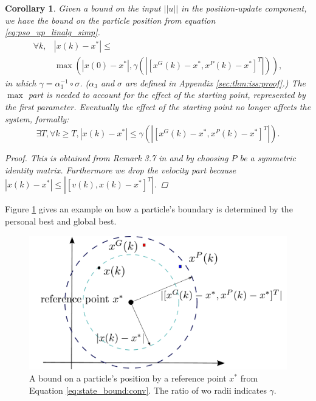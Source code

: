 \documentclass{sig-alternate}
\newtheorem{mycoro}{Corollary}
\begin{document}
\begin{mycoro}
\label{coro:state_bound}
Given a bound on the input $ || u || $ in the position-update component, we have the bound on the particle position from equation \eqref{eq:pso_up_linalg_simp}.
\begin{equation}
\label{eq:state_bound}
\begin{aligned}
\forall k, 
& | x(k) - x^{*} | \leq \\
& \max \left( | x(0) - x^{*} | , \gamma ( | [ x^{G}(k) - x^{*}, x^{P}(k) - x^{*} ]^{T} | ) \right),
\end{aligned}
\end{equation}
in which $ \gamma = \alpha_{3}^{-1} \circ \sigma $.
($ \alpha_{3} $ and $ \sigma $ are defined in Appendix \ref{sec:thm:iss:proof}.)
The $ \max $ part is needed to account for the effect of the starting point, represented by the first parameter. Eventually the effect of the starting point no longer affects the system, formally:
\begin{equation}
\label{eq:state_bound:conv}
\exists T, \forall k \geq T, 
|  x(k) - x^{*} | \leq \gamma ( | [ x^{G}(k) - x^{*}, x^{P}(k) - x^{*} ]^{T} | ).
\end{equation}
\begin{proof}
This is obtained from Remark 3.7 in \cite{Jiang2001857} and by choosing $ P $ be a symmetric identity matrix.
Furthermore we drop the velocity part because $ | x(k) - x^{*} | \leq | [ v(k), x(k) - x^{*} ]^{T} | $.
\end{proof}
\end{mycoro}

Figure \ref{fig:boundary} gives an example on how a particle's boundary is determined by the personal best and global best.

\begin{figure}
\centering
\includegraphics[width=0.8\linewidth]{./boundary}
\caption{A bound on a particle's position by a reference point $ x^{*} $ from Equation \ref{eq:state_bound:conv}.
The ratio of wo radii indicates $ \gamma $.}
\label{fig:boundary}
\end{figure}
\end{document}
